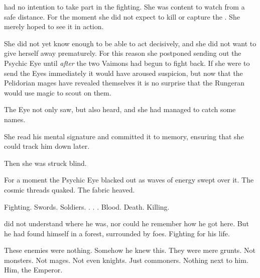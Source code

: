 \Takestsha{} had no intention to take part in the fighting. 
She was content to watch from a safe distance. 
For the moment she did not expect to kill or capture the \vertex. 
She merely hoped to see it in action. 

She did not yet know enough to be able to act decisively, and she did not want to give herself away prematurely. 
For this reason she postponed sending out the Psychic Eye until \emph{after} the two Vaimons had begun to fight back. 
If she were to send the Eyes immediately it would have aroused suspicion, but now that the Pelidorian mages have revealed themselves it is no surprise that the Rungeran \ishrah{} would use magic to scout on them. 

The Eye not only saw, but also heard, and she had managed to catch some names. 

She read his mental signature and committed it to memory, ensuring that she could track him down later. 

Then she was struck blind. 

For a moment the Psychic Eye blacked out as waves of energy swept over it. 
The cosmic threads quaked. 
The fabric heaved. 










\begin{comment}
\subsection{Vizicar awakens}
\end{comment}
\new
Fighting. 
Swords. 
Soldiers. 
\Relcs. 
\Sephiroth. 
\Qliphoth. 
Blood. 
Death. 
Killing. 

\VizicarDurasRespina{} did not understand where he was, nor could he remember how he got here. 
But he had found himself in a forest, surrounded by foes. 
Fighting for his life. 

These enemies were nothing. 
Somehow he knew this. 
They were mere grunts. 
Not monsters. 
Not mages. 
Not even knights. 
Just commoners. 
Nothing next to him. 
Him, the Emperor. 


